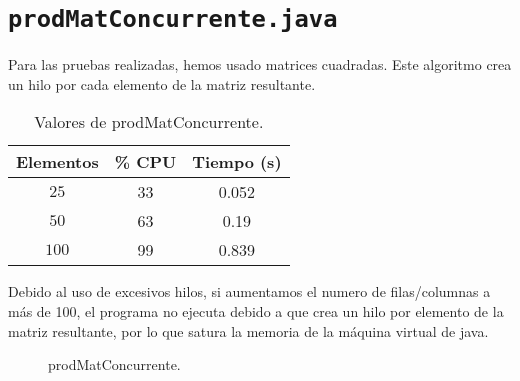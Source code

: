 \documentclass[12pt,letterpaper]{article}
\begin{document}
\section{\texttt{prodMatConcurrente.java}}
\noindent
Para las pruebas realizadas, hemos usado matrices cuadradas. Este algoritmo crea un hilo por cada elemento de la matriz resultante.
\begin{center}
	\begin{table}[htbp]
		\begin{center}
			\begin{tabular}{|c|c|c|}
				\hline
				\textbf{Elementos} & \textbf{\% CPU} & \textbf{Tiempo (s)}  \\
				\hline 
				$25$ & 33 & 0.052\\ \hline
				$50$ & 63 & 0.19\\ \hline
				$100$ & 99 & 0.839\\ \hline	
			\end{tabular}
			\caption{Valores de prodMatConcurrente.}
			\label{tabla:Valores de prodMatConcurrente}
		\end{center}
	\end{table}
\end{center}
\noindent
Debido al uso de excesivos hilos, si aumentamos el numero de filas/columnas a más de 100, el programa no ejecuta debido a que crea un hilo por elemento de la matriz resultante, por lo que satura la memoria de la máquina virtual de java.
\begin{figure}
	\begin{center}
		\caption{prodMatConcurrente.}
		\label{fig: prodMatConcurrente}
	\end{center}	
\end{figure}


\newpage
\end{document}

